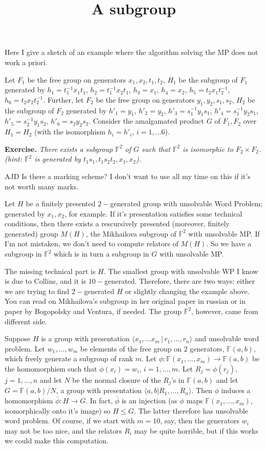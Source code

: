 \documentclass[a4paper,12pt]{article}
\title{A subgroup}
\numberwithin{equation}{section}
\numberwithin{figure}{section}
\newcommand{\FF}{\ensuremath{\mathbb{F}}}
\newcommand{\la}{\langle}
\newcommand{\ra}{\rangle}
\newcommand{\maps}{\rightarrow}
\newenvironment{ajd1}{\noindent\color{red} AJD }{}
\newcommand{\ajd}[1]{\begin{ajd1} #1 \end{ajd1}}
\begin{document}
Here I give a sketch of an example where the algorithm solving the MP does not work a priori.


Let $F_1$ be the free group on generators $x_1,x_2, t_1, t_2$,
$H_1$ be the subgroup of $F_1$ generated by 
$h_1= t_1^{-1} x_1 t_1$, 
$h_2 = t_1^{-1} x_2 t_1$, 
$h_3 =x_1$, 
$h_4 = x_2$,
$h_5= t_2 x_1 t_2^{-1}$, 
$h_6 = t_2 x_2 t_2^{-1}$.
Further, let $F_2$ be the free group on generators $y_1, y_2, s_1, s_2$,
$H_2$ be the subgroup of $F_2$ generated by 
$h'_1= y_1$, 
$h'_2 = y_2$, 
$h'_3 = s_1^{-1} y_1 s_1 $, 
$h'_4 = s_1^{-1} y_2 s_1$,
$h'_5= s_2^{-1} y_1 s_2$, 
$h'_6 = s_2 y_2 s_2$.
Consider the amalgamated product $G$ of $F_1, F_2$ over $H_1=H_2$ (with the isomorphism $h_i = h'_i$, $i = 1,\ldots 6$).

{\bf Exercise.} {\it There exists a subgroup $\mathbb{F}^2$ of $G$ such that $\mathbb{F}^2$ is isomorphic to $F_2 \times F_2$.
(hint: $\mathbb{F}^2$ is generated by $t_1s_1, t_1s_2t_2, x_1, x_2$).}

\ajd{Is there a marking scheme? I don't want to use all my time on this if it's not worth many marks.}

Let $H$ be a finitely presented $2-$generated group with unsolvable Word Problem; generated by $x_1, x_2$, for example. If it's presentation satisfies some technical conditions, then there exists a rescursively presented (moreover, finitely generated) group $M(H)$, the Mikhailova subgroup of $\mathbb{F}^2$ with unsolvable MP.
If I'm not mistaken, we don't need to compute relators of $M(H)$. So we have a subgroup in $\mathbb{F}^2$ which is in turn a subgroup in $G$ with unsolvable MP.

The missing technical part is $H$. The smallest group with unsolvable WP I know is due to Collins, and it is $10-$generated. Therefore, there are two ways: either we are trying to find $2-$generated $H$ or slightly changing the example above.
You can read on Mikhailova's subgroup in her original paper in russian or in paper by Bogopolsky and Ventura, if needed. 
The group $\mathbb{F}^2$, however, came from different side.

Suppose $H$ is a group
with presentation $\la x_1, \ldots x_m\,|\, r_1,\ldots ,r_n\ra$ and unsolvable
word problem. Let $w_1, \ldots , w_m$ be elements of the free group on
2 generators, $\FF(a,b)$, which freely generate a subgroup of rank $m$. 
Let $\phi:\FF(x_1,\ldots, x_m) \maps \FF(a,b)$ 
be the homomorphism such that $\phi(x_i)=w_i$, 
$i=1,\ldots, m$. 
Let $R_j=\phi(r_j)$, $j=1,\ldots ,n$ and let $N$ be the normal closure of 
the $R_j$'s in $\FF(a,b)$ and let $G=\FF(a,b)/N$, a group with presentation
$\la a, b|R_1, \ldots, R_n\ra$. 
Then $\phi$ induces a homomorphism $\bar\phi:H\maps  G$. 
In fact, $\bar\phi$ is an injection (as $\phi$ maps $\FF(x_1,\ldots ,x_{m})$, 
isomorphically onto it's image) so $H\le G$. The latter therefore has
unsolvable word problem. Of course, if we start with $m=10$, say, then 
 the generators $w_i$ may not be too nice,
and the relators $R_i$ may be quite horrible, but if this works we could 
make this computation.
\end{document}
